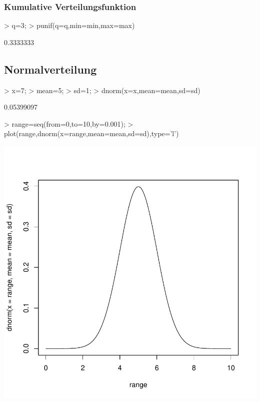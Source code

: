 \subsubsection{Kumulative Verteilungsfunktion}
\begin{Schunk}
\begin{Sinput}
> q=3;
> punif(q=q,min=min,max=max)
\end{Sinput}
\begin{Soutput}
[1] 0.3333333
\end{Soutput}
\end{Schunk}

\subsection{Normalverteilung}
\begin{Schunk}
\begin{Sinput}
> x=7;
> mean=5;
> sd=1;
> dnorm(x=x,mean=mean,sd=sd)
\end{Sinput}
\begin{Soutput}
[1] 0.05399097
\end{Soutput}
\begin{Sinput}
> range=seq(from=0,to=10,by=0.001);
> plot(range,dnorm(x=range,mean=mean,sd=sd),type='l')
\end{Sinput}
\end{Schunk}
\includegraphics{definitionen-019}

